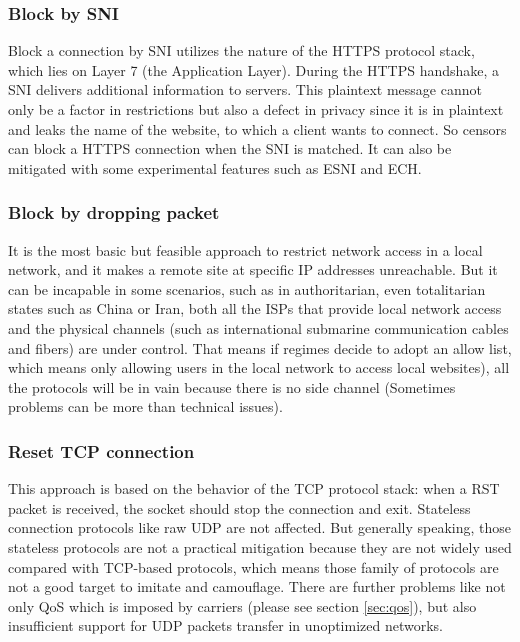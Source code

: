 \documentclass[conference]{IEEEtran}
\begin{document}
\subsubsection{Block by SNI}
Block a connection by SNI utilizes the nature of the HTTPS protocol stack, which lies on Layer 7 (the Application Layer). During the HTTPS handshake, a SNI delivers additional information to servers. This plaintext message cannot only be a factor in restrictions but also a defect in privacy since it is in plaintext and leaks the name of the website, to which a client wants to connect. So censors can block a HTTPS connection when the SNI is matched. 
It can also be mitigated with some experimental features such as ESNI and ECH.

\subsubsection{Block by dropping packet}
It is the most basic but feasible approach to restrict network access in a local network, and it makes a remote site at specific IP addresses unreachable. 
But it can be incapable in some scenarios, such as in authoritarian, even totalitarian states such as China or Iran, both all the ISPs that provide local network access and the physical channels (such as international submarine communication cables and fibers) are under control. 
That means if regimes decide to adopt an allow list, which means only allowing users in the local network to access local websites), all the protocols will be in vain because there is no side channel (Sometimes problems can be more than technical issues).

\subsubsection{Reset TCP connection}
This approach is based on the behavior of the TCP protocol stack: when a RST packet is received, the socket should stop the connection and exit. Stateless connection protocols like raw UDP are not affected. But generally speaking, those stateless protocols are not a practical mitigation because they are not widely used compared with TCP-based protocols, which means those family of protocols are not a good target to imitate and camouflage. There are further problems like not only QoS which is imposed by carriers (please see section \ref{sec:qos}), but also insufficient support for UDP packets transfer in unoptimized networks.
\end{document}
